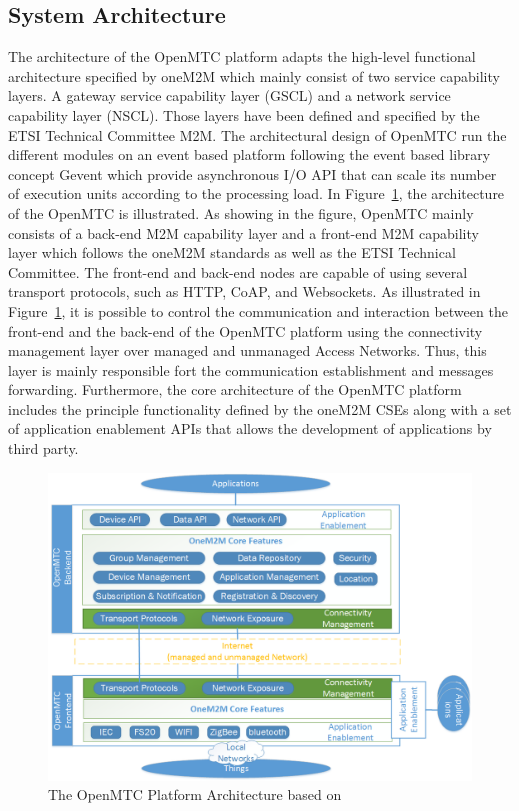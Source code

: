 \subsection{System Architecture}
The architecture of the OpenMTC platform adapts the high-level functional architecture specified by oneM2M which mainly consist of two service capability layers. A gateway service capability layer (GSCL) and a network service capability layer (NSCL). Those layers have been defined and specified by the ETSI Technical Committee M2M. The architectural design of OpenMTC run the different modules on an event based platform following the event based library concept Gevent which provide asynchronous I/O API that can scale its number of execution units according to the processing load. In Figure~\ref{fig:contrib2:openmtc}, the architecture of the OpenMTC is illustrated. As showing in the figure, OpenMTC mainly consists of a back-end M2M capability layer and a front-end M2M capability layer which follows the oneM2M standards as well as the ETSI Technical Committee. The front-end and back-end nodes are capable of using several transport protocols, such as HTTP, CoAP, and Websockets. As illustrated in Figure~\ref{fig:contrib2:openmtc}, it is possible to control the communication and interaction between the front-end and the back-end of the OpenMTC platform using the connectivity management layer over managed and unmanaged Access Networks. Thus, this layer is mainly responsible fort the communication establishment and messages forwarding. Furthermore, the core architecture of the OpenMTC platform includes the principle functionality defined by the oneM2M CSEs along with a set of application enablement APIs that allows the development of applications by third party.\par
\begin{figure}[htbp]
    \centering
    \includegraphics[width=1.1\textwidth]{resources/images/openmtc}
    \caption{The OpenMTC Platform Architecture based on~\cite{owlpic}}\label{fig:contrib2:openmtc}
\end{figure}
